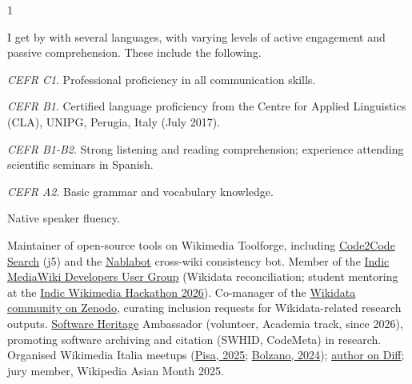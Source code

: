 \documentclass[10pt,a4paper,ragged2e,academicons]{altacv}
\newif\ifshortcv
\newcommand{\longonly}[1]{\ifshortcv\else#1\fi}%
\newcommand{\hindi}{}%
\begin{document}
\begin{paracol}{1}

\smallskip

\ifshortcv\else
I get by with several languages, with varying levels of active engagement and passive comprehension. These include the following.

\divider
\fi

{\em CEFR C1}. Professional proficiency in all communication skills.


{\em CEFR B1}. Certified language proficiency from the Centre for Applied Linguistics (CLA), UNIPG, Perugia, Italy (July 2017).


{\em CEFR B1-B2}. Strong listening and reading comprehension; experience attending scientific seminars in Spanish.


\ifshortcv\else%
\cvskill{{\hindi हिन्दी} [Hindi]}{1}
{\em CEFR A2}. Basic grammar and vocabulary knowledge.
\fi


Native speaker fluency.

\smallskip

    


\noindent Maintainer of open-source tools on Wikimedia Toolforge, including \href{https://code2codesearch.toolforge.org/}{Code2Code Search} (j5) and the \href{https://it.wikipedia.org/wiki/Utente:Nablabot}{Nablabot} cross-wiki consistency bot. Member of the \href{https://meta.wikimedia.org/wiki/Indic_MediaWiki_Developers_User_Group}{Indic MediaWiki Developers User Group} (Wikidata reconciliation; student mentoring at the \href{https://diff.wikimedia.org/2026/07/23/indic-wikimedia-hackathon-hyderabad-2026/}{Indic Wikimedia Hackathon 2026}). Co-manager of the \href{https://zenodo.org/communities/wikidata}{Wikidata community on Zenodo}, curating inclusion requests for Wikidata-related research outputs. \href{https://www.softwareheritage.org/}{Software Heritage} Ambassador (volunteer, Academia track, since 2026), promoting software archiving and citation (SWHID, CodeMeta) in research. \longonly{Organised Wikimedia Italia meetups (\href{https://it.wikipedia.org/wiki/Wikipedia:Raduni/Wiki-cinema_indiano_a_Pisa}{Pisa, 2025}; \href{https://it.wikipedia.org/wiki/Wikipedia:Raduni/Wiki-Pakistan}{Bolzano, 2024}); \href{https://diff.wikimedia.org/author/super-nabla/}{author on Diff}; jury member, Wikipedia Asian Month 2025.}


\end{paracol}
\end{document}
